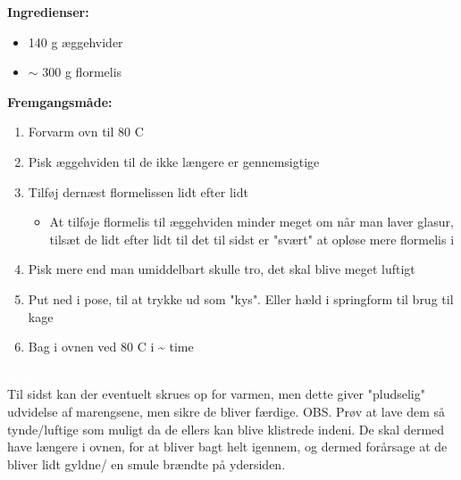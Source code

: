 \documentclass{book}
\begin{document}
\begin{minipage}[t]{0.5\textwidth}
\textbf{Ingredienser:}
\begin{itemize}
    \item 140 g æggehvider
    \item $\sim$ 300 g flormelis
\end{itemize}
\end{minipage}
\begin{minipage}[t]{0.5\textwidth}
\textbf{Fremgangsmåde:}
\begin{enumerate}
    \item Forvarm ovn til 80 \degree C
    \item Pisk æggehviden til de ikke længere er gennemsigtige
    \item Tilføj dernæst flormelissen lidt efter lidt
    \begin{itemize}
        \item At tilføje flormelis til æggehviden minder meget om når man laver glasur, tilsæt de lidt efter lidt til det til sidst er "svært" at opløse mere flormelis i
    \end{itemize}
    \item Pisk mere end man umiddelbart skulle tro, det skal blive meget luftigt
    \item Put ned i pose, til at trykke ud som "kys". Eller hæld i springform til brug til kage
    \item Bag i ovnen ved 80 \degree C i \~  time
\end{enumerate}
\end{minipage}
\textcolor{white}{white}\\
Til sidst kan der eventuelt skrues op for varmen, men dette giver "pludselig" udvidelse af marengsene, men sikre de bliver færdige.
OBS. Prøv at lave dem så tynde/luftige som muligt da de ellers kan blive klistrede indeni. De skal dermed have længere i ovnen, for at bliver bagt helt igennem, og dermed forårsage at de bliver lidt gyldne/ en smule brændte på ydersiden.  
\end{document}
